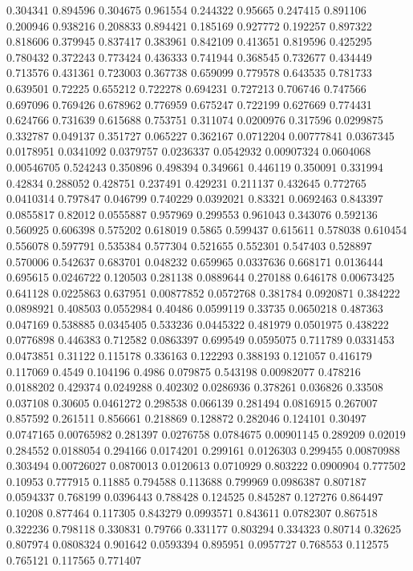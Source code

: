 0.304341 0.894596
0.304675 0.961554
0.244322 0.95665
0.247415 0.891106
0.200946 0.938216
0.208833 0.894421
0.185169 0.927772
0.192257 0.897322
0.818606 0.379945
0.837417 0.383961
0.842109 0.413651
0.819596 0.425295
0.780432 0.372243
0.773424 0.436333
0.741944 0.368545
0.732677 0.434449
0.713576 0.431361
0.723003 0.367738
0.659099 0.779578
0.643535 0.781733
0.639501 0.72225
0.655212 0.722278
0.694231 0.727213
0.706746 0.747566
0.697096 0.769426
0.678962 0.776959
0.675247 0.722199
0.627669 0.774431
0.624766 0.731639
0.615688 0.753751
0.311074 0.0200976
0.317596 0.0299875
0.332787 0.049137
0.351727 0.065227
0.362167 0.0712204
0.00777841 0.0367345
0.0178951 0.0341092
0.0379757 0.0236337
0.0542932 0.00907324
0.0604068 0.00546705
0.524243 0.350896
0.498394 0.349661
0.446119 0.350091
0.331994 0.42834
0.288052 0.428751
0.237491 0.429231
0.211137 0.432645
0.772765 0.0410314
0.797847 0.046799
0.740229 0.0392021
0.83321 0.0692463
0.843397 0.0855817
0.82012 0.0555887
0.957969 0.299553
0.961043 0.343076
0.592136 0.560925
0.606398 0.575202
0.618019 0.5865
0.599437 0.615611
0.578038 0.610454
0.556078 0.597791
0.535384 0.577304
0.521655 0.552301
0.547403 0.528897
0.570006 0.542637
0.683701 0.048232
0.659965 0.0337636
0.668171 0.0136444
0.695615 0.0246722
0.120503 0.281138
0.0889644 0.270188
0.646178 0.00673425
0.641128 0.0225863
0.637951 0.00877852
0.0572768 0.381784
0.0920871 0.384222
0.0898921 0.408503
0.0552984 0.40486
0.0599119 0.33735
0.0650218 0.487363
0.047169 0.538885
0.0345405 0.533236
0.0445322 0.481979
0.0501975 0.438222
0.0776898 0.446383
0.712582 0.0863397
0.699549 0.0595075
0.711789 0.0331453
0.0473851 0.31122
0.115178 0.336163
0.122293 0.388193
0.121057 0.416179
0.117069 0.4549
0.104196 0.4986
0.079875 0.543198
0.00982077 0.478216
0.0188202 0.429374
0.0249288 0.402302
0.0286936 0.378261
0.036826 0.33508
0.037108 0.30605
0.0461272 0.298538
0.066139 0.281494
0.0816915 0.267007
0.857592 0.261511
0.856661 0.218869
0.128872 0.282046
0.124101 0.30497
0.0747165 0.00765982
0.281397 0.0276758
0.0784675 0.00901145
0.289209 0.02019
0.284552 0.0188054
0.294166 0.0174201
0.299161 0.0126303
0.299455 0.00870988
0.303494 0.00726027
0.0870013 0.0120613
0.0710929 0.803222
0.0900904 0.777502
0.10953 0.777915
0.11885 0.794588
0.113688 0.799969
0.0986387 0.807187
0.0594337 0.768199
0.0396443 0.788428
0.124525 0.845287
0.127276 0.864497
0.10208 0.877464
0.117305 0.843279
0.0993571 0.843611
0.0782307 0.867518
0.322236 0.798118
0.330831 0.79766
0.331177 0.803294
0.334323 0.80714
0.32625 0.807974
0.0808324 0.901642
0.0593394 0.895951
0.0957727 0.768553
0.112575 0.765121
0.117565 0.771407

